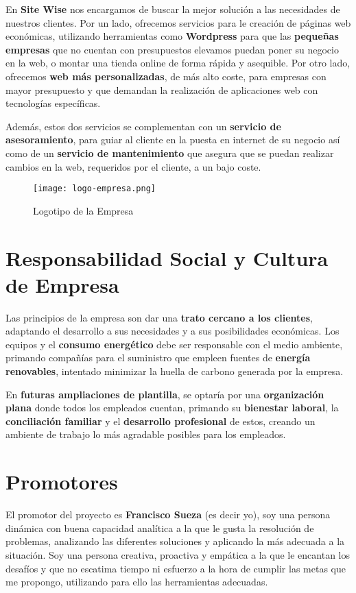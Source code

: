 En \textbf{Site Wise} nos encargamos de buscar la mejor solución a las necesidades de nuestros clientes. Por un lado, ofrecemos servicios para le creación de páginas web económicas, utilizando herramientas como \textbf{Wordpress} para que las \textbf{pequeñas empresas} que no cuentan con presupuestos elevamos puedan poner su negocio en la web, o montar una tienda online de forma rápida y asequible. Por otro lado, ofrecemos \textbf{web más personalizadas}, de más alto coste, para empresas con mayor presupuesto y que demandan la realización de aplicaciones web con tecnologías específicas.

Además, estos dos servicios se complementan con un \textbf{servicio de asesoramiento}, para guiar al cliente en la puesta en internet de su negocio así como de un \textbf{servicio de mantenimiento} que asegura que se puedan realizar cambios en la web, requeridos por el cliente, a un bajo coste.

\begin{figure}[H]
    \centering
    \texttt{[image: logo-empresa.png]}
    \caption{Logotipo de la Empresa}
\end{figure}

\section{Responsabilidad Social y Cultura de Empresa}
Las principios de la empresa son dar una \textbf{trato cercano a los clientes}, adaptando el desarrollo a sus necesidades y a sus posibilidades económicas. Los equipos y el \textbf{consumo energético} debe ser responsable con el medio ambiente, primando compañías para el suministro que empleen fuentes de \textbf{energía renovables}, intentado minimizar la huella de carbono generada por la empresa.

En \textbf{futuras ampliaciones de plantilla}, se optaría por una \textbf{organización plana} donde todos los empleados cuentan, primando su \textbf{bienestar laboral}, la \textbf{conciliación familiar} y el \textbf{desarrollo profesional} de estos, creando un ambiente de trabajo lo más agradable posibles para los empleados.

\section{Promotores}
El promotor del proyecto es \textbf{Francisco Sueza} (es decir yo), soy una persona dinámica con buena capacidad analítica a la que le gusta la resolución de problemas, analizando las diferentes soluciones y aplicando la más adecuada a la situación. Soy una persona creativa, proactiva y empática a la que le encantan los desafíos y que no escatima tiempo ni esfuerzo a la hora de cumplir las metas que me propongo, utilizando para ello las herramientas adecuadas.

